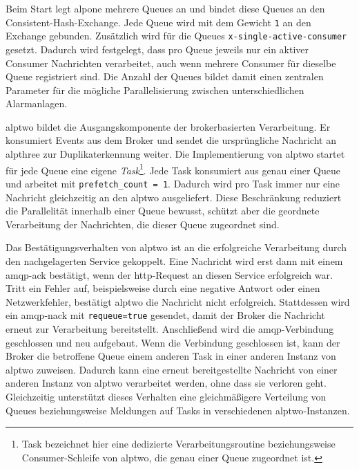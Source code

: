 Beim Start legt \gls{alpone} mehrere Queues an und bindet diese Queues an den Consistent-Hash-Exchange. Jede Queue wird mit dem Gewicht \texttt{1} an den Exchange gebunden. Zusätzlich wird für die Queues \texttt{x-single-active-consumer} gesetzt. Dadurch wird festgelegt, dass pro Queue jeweils nur ein aktiver Consumer Nachrichten verarbeitet, auch wenn mehrere Consumer für dieselbe Queue registriert sind. Die Anzahl der Queues bildet damit einen zentralen Parameter für die mögliche Parallelisierung zwischen unterschiedlichen Alarmanlagen.

\gls{alptwo} bildet die Ausgangskomponente der brokerbasierten Verarbeitung. Er konsumiert Events aus dem Broker und sendet die ursprüngliche Nachricht an \gls{alpthree} zur Duplikaterkennung weiter. %
Die Implementierung von \gls{alptwo} startet für jede Queue eine eigene \textit{Task}\footnote{Task bezeichnet hier eine dedizierte Verarbeitungsroutine beziehungsweise Consumer-Schleife von \gls{alptwo}, die genau einer Queue zugeordnet ist.}. Jede Task konsumiert aus genau einer Queue und arbeitet mit \texttt{prefetch\_count = 1}. Dadurch wird pro Task immer nur eine Nachricht gleichzeitig an den \gls{alptwo} ausgeliefert. Diese Beschränkung reduziert die Parallelität innerhalb einer Queue bewusst, schützt aber die geordnete Verarbeitung der Nachrichten, die dieser Queue zugeordnet sind.

Das Bestätigungsverhalten von \gls{alptwo} ist an die erfolgreiche Verarbeitung durch den nachgelagerten Service gekoppelt. Eine Nachricht wird erst dann mit einem \gls{amqp}-\gls{ack} bestätigt, wenn der \gls{http}-Request an diesen Service erfolgreich war. Tritt ein Fehler auf, beispielsweise durch eine negative Antwort oder einen Netzwerkfehler, bestätigt \gls{alptwo} die Nachricht nicht erfolgreich. Stattdessen wird ein \gls{amqp}-\gls{nack} mit \texttt{requeue=true} gesendet, damit der Broker die Nachricht erneut zur Verarbeitung bereitstellt. Anschließend wird die \gls{amqp}-Verbindung geschlossen und neu aufgebaut. Wenn die Verbindung geschlossen ist, kann der Broker die betroffene Queue einem anderen Task in einer anderen Instanz von \gls{alptwo} zuweisen. Dadurch kann eine erneut bereitgestellte Nachricht von einer anderen Instanz von \gls{alptwo} verarbeitet werden, ohne dass sie verloren geht. Gleichzeitig unterstützt dieses Verhalten eine gleichmäßigere Verteilung von Queues beziehungsweise Meldungen auf Tasks in verschiedenen \gls{alptwo}-Instanzen.

